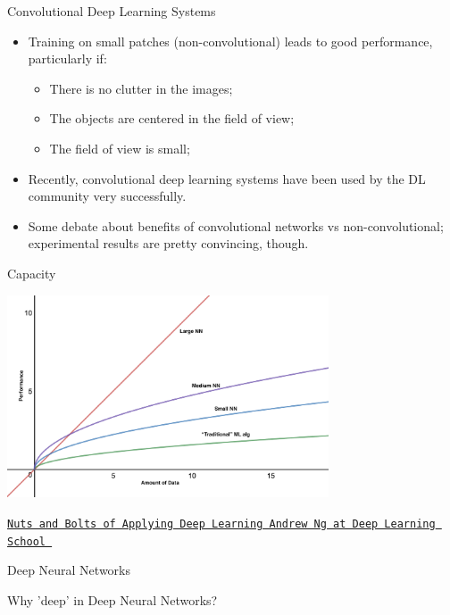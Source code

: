 \documentclass[12pt,t]{beamer}
\begin{document}
\begin{frame}

Convolutional Deep Learning Systems

\begin{itemize}

\item Training on small patches (non-convolutional) leads to good performance, particularly if:
	
	\begin{itemize}
	\item There is no clutter in the images;
	\item The objects are centered in the field of view; 
	\item The field of view is small;
	\end{itemize}
	
\item Recently, convolutional deep learning systems have been used by the DL community very successfully.
\item Some debate about benefits of convolutional networks vs non-convolutional; experimental results are pretty convincing, though.

\end{itemize}
\end{frame}

\begin{frame}[c]{Capacity}

\includegraphics[height=60mm]{Figs/performance.png}

\hfill
{\footnotesize \lolit
\href{https://www.youtube.com/watch?v=F1ka6a13S9I}{\tt Nuts and Bolts of Applying Deep Learning Andrew Ng at Deep Learning School }
}

\end{frame}


\begin{frame}[c]{Deep Neural Networks}

\pause

Why 'deep' in Deep Neural Networks?

\end{frame}
\end{document}
